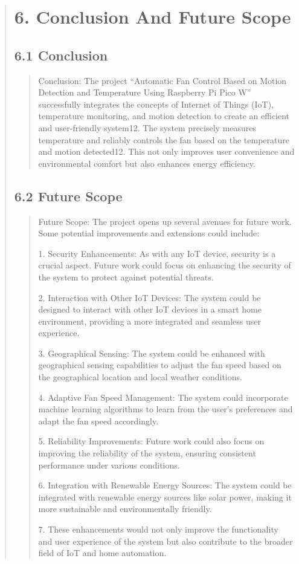 \documentclass[12pt]{report}
\begin{document}
	
	
	\clearpage
	
	
	\begin{quote}
		\section{6. Conclusion And Future Scope}
		\subsection{6.1 Conclusion}
		\begin{quote}
			Conclusion: The project “Automatic Fan Control Based on Motion Detection and Temperature Using Raspberry Pi Pico W” successfully integrates the concepts of Internet of Things (IoT), temperature monitoring, and motion detection to create an efficient and user-friendly system12. The system precisely measures temperature and reliably controls the fan based on the temperature and motion detected12. This not only improves user convenience and environmental comfort but also enhances energy efficiency.
		\end{quote}
		\clearpage
		\subsection{6.2 Future Scope}
		\begin{quote}
			Future Scope: The project opens up several avenues for future work. Some potential improvements and extensions could include:
			
			1. Security Enhancements: As with any IoT device, security is a crucial aspect. Future work could focus on enhancing the security of the system to protect against potential threats.
			
			2. Interaction with Other IoT Devices: The system could be designed to interact with other IoT devices in a smart home environment, providing a more integrated and seamless user experience.
			
			3. Geographical Sensing: The system could be enhanced with geographical sensing capabilities to adjust the fan speed based on the geographical location and local weather conditions.
			
			4. Adaptive Fan Speed Management: The system could incorporate machine learning algorithms to learn from the user’s preferences and adapt the fan speed accordingly.
			
			5. Reliability Improvements: Future work could also focus on improving the reliability of the system, ensuring consistent performance under various conditions.
			
			6. Integration with Renewable Energy Sources: The system could be integrated with renewable energy sources like solar power, making it more sustainable and environmentally friendly.
			
			7. These enhancements would not only improve the functionality and user experience of the system but also contribute to the broader field of IoT and home automation.
			
			
		\end{quote}
		
	\end{quote}
	\clearpage
	
\end{document}
